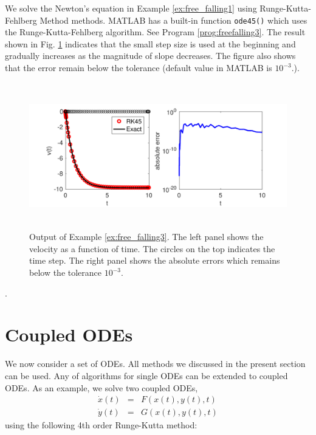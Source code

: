\begin{example}\label{ex:free_falling3} 
We solve the Newton's equation in Example \ref{ex:free_falling1} using Runge-Kutta-Fehlberg Method methods. MATLAB has a built-in function \texttt{ode45()} which uses the Runge-Kutta-Fehlberg algorithm. See Program \ref{prog:freefalling3}.
The result shown in Fig. \ref{fig:free_falling3} indicates that the small step size is used at the beginning and gradually increases as the magnitude of slope decreases.  The figure also shows that the error remain below the tolerance (default value in MATLAB is $10^{-3}$.).

\begin{figure}
	\centerline{\includegraphics[height=2.5in]{05.ode1/free_falling3.pdf}}
	\caption{Output of Example \ref{ex:free_falling3}.  The left panel shows the velocity as a function of time.  The circles on the top indicates the time step.  The right panel shows the absolute errors which remains below the tolerance $10^{-3}$.}
	\label{fig:free_falling3}
\end{figure}
\end{example}
.


\noindent
\section{Coupled ODEs}

We now consider a set of ODEs. All methods we discussed in the present section can be used. Any of algorithms for single ODEs can be extended to coupled ODEs. As an example,  we solve two coupled ODEs,
\begin{subequations}
\begin{eqnarray}
\dot{x}(t) &=& F (x(t),y(t),t)\\
\dot{y}(t) &=& G (x(t),y(t),t)
\end{eqnarray}
\label{eq:coupled-ode}
\end{subequations}
using the following 4th order Runge-Kutta method:
 
